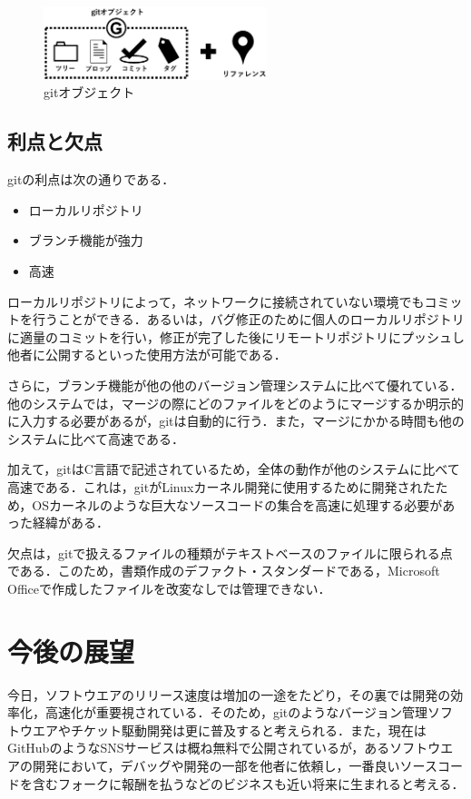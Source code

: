 \documentclass[a4paper,9pt,twocolumn]{jsarticle}
\begin{document}
\begin{figure}[h]
\centering
\includegraphics[width=65mm]{img/git_obj2.eps}
\caption{gitオブジェクト}
\label{object2}
\end{figure}


\subsection{利点と欠点}
gitの利点は次の通りである．

\begin{itemize}
\item ローカルリポジトリ
\item ブランチ機能が強力
\item 高速
\end{itemize}

ローカルリポジトリによって，ネットワークに接続されていない環境でもコミットを行うことができる．あるいは，バグ修正のために個人のローカルリポジトリに適量のコミットを行い，修正が完了した後にリモートリポジトリにプッシュし他者に公開するといった使用方法が可能である．

さらに，ブランチ機能が他の他のバージョン管理システムに比べて優れている．他のシステムでは，マージの際にどのファイルをどのようにマージするか明示的に入力する必要があるが，gitは自動的に行う．また，マージにかかる時間も他のシステムに比べて高速である．

加えて，gitはC言語で記述されているため，全体の動作が他のシステムに比べて高速である．これは，gitがLinuxカーネル開発に使用するために開発されたため，OSカーネルのような巨大なソースコードの集合を高速に処理する必要があった経緯がある．

欠点は，gitで扱えるファイルの種類がテキストベースのファイルに限られる点である．このため，書類作成のデファクト・スタンダードである，Microsoft Officeで作成したファイルを改変なしでは管理できない．

\section{今後の展望}
今日，ソフトウエアのリリース速度は増加の一途をたどり，その裏では開発の効率化，高速化が重要視されている．そのため，gitのようなバージョン管理ソフトウエアやチケット駆動開発は更に普及すると考えられる．また，現在はGitHubのようなSNSサービスは概ね無料で公開されているが，あるソフトウエアの開発において，デバッグや開発の一部を他者に依頼し，一番良いソースコードを含むフォークに報酬を払うなどのビジネスも近い将来に生まれると考える．
\end{document}
